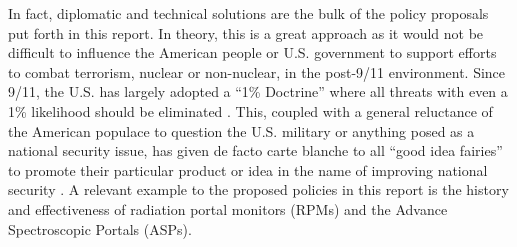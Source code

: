 \documentclass{report}
\begin{document}
In fact, diplomatic and technical solutions are the bulk of the policy proposals put forth in this report.  In theory, this is a great approach as it would not be difficult to influence the American people or U.S. government to support efforts to combat terrorism, nuclear or non-nuclear, in the post-9/11 environment. Since 9/11, the U.S. has largely adopted a \enquote{1\% Doctrine} where all threats with even a 1\% likelihood should be eliminated \cite{pollack2014unthinkable}. This, coupled with a general reluctance of the American populace to question the U.S. military or anything posed as a national security issue, has given de facto carte blanche to all \enquote{good idea fairies} to promote their particular product or idea in the name of improving national security \cite{Fallows2015}. A relevant example to the proposed policies in this report is the history and effectiveness of radiation portal monitors (RPMs) and the Advance Spectroscopic Portals (ASPs).
\end{document}
